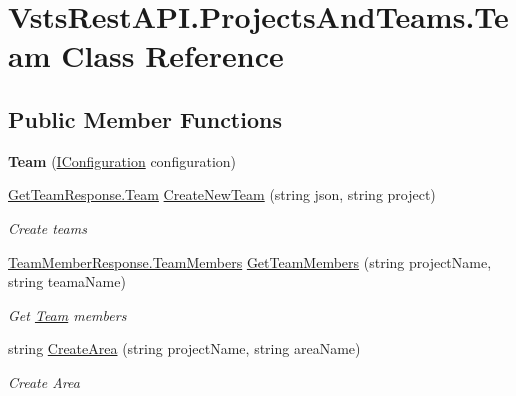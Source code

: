 \hypertarget{class_vsts_rest_a_p_i_1_1_projects_and_teams_1_1_team}{}\section{Vsts\+Rest\+A\+P\+I.\+Projects\+And\+Teams.\+Team Class Reference}
\label{class_vsts_rest_a_p_i_1_1_projects_and_teams_1_1_team}
\subsection*{Public Member Functions}
\begin{DoxyCompactItemize}
\item 
\mbox{\label{class_vsts_rest_a_p_i_1_1_projects_and_teams_1_1_team_a9f31252f6d3ccf04bae84eb976c7bc00}} 
{\bfseries Team} (\mbox{\hyperlink{interface_vsts_rest_a_p_i_1_1_i_configuration}{I\+Configuration}} configuration)
\item 
\mbox{\hyperlink{class_vsts_rest_a_p_i_1_1_viewmodel_1_1_project_and_teams_1_1_get_team_response_1_1_team}{Get\+Team\+Response.\+Team}} \mbox{\hyperlink{class_vsts_rest_a_p_i_1_1_projects_and_teams_1_1_team_ab42d1bd636a827438a8151f795fedca0}{Create\+New\+Team}} (string json, string project)
\begin{DoxyCompactList}\small\item\em Create teams \end{DoxyCompactList}\item 
\mbox{\hyperlink{class_vsts_rest_a_p_i_1_1_viewmodel_1_1_project_and_teams_1_1_team_member_response_1_1_team_members}{Team\+Member\+Response.\+Team\+Members}} \mbox{\hyperlink{class_vsts_rest_a_p_i_1_1_projects_and_teams_1_1_team_a08de9d00456ae8e5407adfb6e3f1f135}{Get\+Team\+Members}} (string project\+Name, string teama\+Name)
\begin{DoxyCompactList}\small\item\em Get \mbox{\hyperlink{class_vsts_rest_a_p_i_1_1_projects_and_teams_1_1_team}{Team}} members \end{DoxyCompactList}\item 
string \mbox{\hyperlink{class_vsts_rest_a_p_i_1_1_projects_and_teams_1_1_team_ab57dd1be0d460862a1b4cd64a69b81b8}{Create\+Area}} (string project\+Name, string area\+Name)
\begin{DoxyCompactList}\small\item\em Create Area \end{DoxyCompactList}\item 

\end{DoxyCompactItemize}
